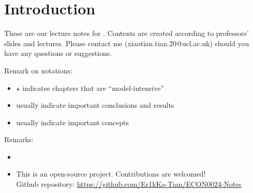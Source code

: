 \chapter*{Introduction}
These are our  lecture notes for . Contents are created according to professors' slides and lectures. Please contact me  (xiaotian.tian.20@ucl.ac.uk) should you have any questions or suggestions.

Remark on notations:
\begin{itemize}
    \item $\star$ indicates chapters that are ``model-intensive''
    \item {} usually indicate important conclusions and results
    \item {} usually indicate important concepts
\end{itemize}

Remarks:
\begin{itemize}
    \item {}
    \item This is an open-source project. Contributions are welcomed!\\Github repository: \url{https://github.com/Er1kKa-Tian/ECON0024-Notes}
\end{itemize}



\iffalse
    \begin{figure}[H]
        \centering
        \texttt{[image: images/102115356\_p0.jpg]}
        \caption{Enjoy this lovely picture before we start!}
        \label{fig:Introduction}
    \end{figure}
\fi
